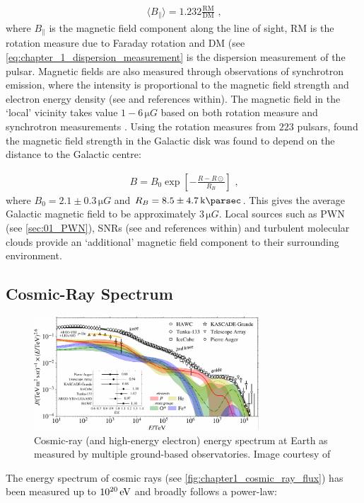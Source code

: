 \begin{equation}
    \begin{aligned}
    \langle B_\parallel \rangle = 1.232 \frac{\text{RM}}{\text{DM}}\text{ ,}
    \end{aligned}
\end{equation}
\noindent where $B_\parallel$ is the magnetic field component along the line of sight, RM is the rotation measure due to Faraday rotation and DM (see \autoref{eq:chapter_1_dispersion_measurement} is the dispersion measurement of the pulsar. Magnetic fields are also measured through observations of synchrotron emission, where the intensity is proportional to the magnetic field strength and electron energy density (see \cite{2013pss5.book..641B} and references within).
\newpar 
The magnetic field in the `local' vicinity takes value $1-6\,\si{\micro G}$ based on both rotation measure and synchrotron measurements  \citep{1989ApJ...343..760R,2001SSRv...99..243B}.  Using the rotation measures from $223$ pulsars, \cite{2006ApJ...642..868H} found the magnetic field strength in the Galactic disk was found to depend on the distance to the Galactic centre:

\begin{equation}
    \begin{aligned}
        B=B_0\exp[-\frac{R-R\odot}{R_B }]\text{ ,}
    \end{aligned}
\end{equation}
where $B_0=2.1\pm 0.3\,\si{\micro G}$ and $R_B=8.5\pm 4.7\,\kpc$. This gives the average Galactic magnetic field to be approximately $ 3\,\si{\micro G}$. Local sources such as PWN (see \autoref{sec:01_PWN}), SNRs (see \citep{2012SSRv..166..231R} and references within) and turbulent molecular clouds \citep{2010ApJ...725..466C} provide an `additional' magnetic field component to their surrounding environment.

\subsection{Cosmic-Ray Spectrum} \label{sec:chapter_1_cr_spectrum}
\begin{figure}
    \centering
    \includegraphics[width=0.75\textwidth]{04_Introduction/Images/cosmic_rays/cosmic_ray_spectrum.pdf}
    \caption{Cosmic-ray (and high-energy electron) energy spectrum at Earth as measured by multiple ground-based observatories. Image courtesy of \cite{2019BAAS...51c.131S}}
    \label{fig:chapter1_cosmic_ray_flux}
\end{figure}
\newpar
The energy spectrum of cosmic rays (see \autoref{fig:chapter1_cosmic_ray_flux}) has been measured up to $10^{20}\,\si{\electronvolt}$ \citep{2022arXiv221116020T} and broadly follows a power-law:

